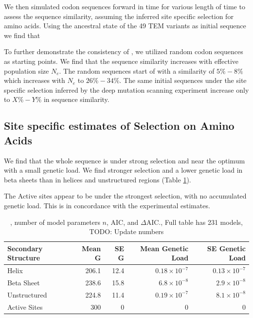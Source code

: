 \documentclass[12pt]{article}
\begin{document}
We then simulated codon sequences forward in time for various length of time to assess the sequence similarity, assuming the \selac inferred site specific selection for amino acids.
Using the ancestral state of the 49 TEM variants as initial sequence we find that 


To further demonstrate the consistency of \selac, we utilized random codon sequences as starting points.
We find that the sequence similarity increases with effective population size $N_e$.
The random sequences start of with a similarity of $5 \% - 8 \%$ which increases with $N_e$ to $26 \% - 34 \%$.
The same initial sequences under the site specific selection inferred by the deep mutation scanning experiment increase only to $X \% - Y \%$ in sequence similarity.



\subsection*{Site specific estimates of Selection on Amino Acids}
We find that the whole sequence is under strong selection and near the optimum with a small genetic load.
We find stronger selection and a lower genetic load in beta sheets than in helices and unstructured regions (Table \ref{tab:selection}).

The Active sites appear to be under the strongest selection, with no accumulated genetic load.
This is in concordance with the experimental estimates.

\begin{table}
  \centering
  \begin{tabular}{lrrrr}
    Secondary Structure	& Mean G & SE G & Mean Genetic Load & SE Genetic Load \\ \hline 
    Helix		& 206.1 & 12.4 & $0.18\times10^{-7}$ & $0.13\times10^{-7}$ \\
    Beta Sheet 		& 238.6 & 15.8 & $6.8\times10^{-8}$ & $2.9\times10^{-8}$ \\
    Unstructured	& 224.8 & 11.4 & $0.19\times10^{-7}$ & $8.1\times10^{-8}$ \\
    Active Sites	& 300   & 0    & 0      & 0      \\
  \end{tabular}
  \caption{\LLik, number of model parameters $n$, AIC, and $\Delta$AIC., Full table has 231 models, TODO: Update numbers}
  \label{tab:selection}
\end{table}
\end{document}
